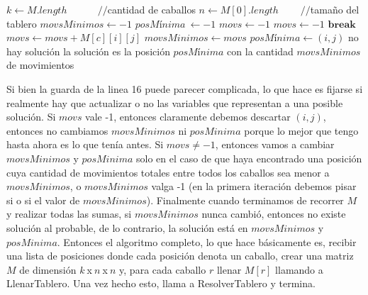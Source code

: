 \documentclass[a4paper]{article}
\begin{document}
\begin{algorithmic}[1]
	\State $k \gets M.length \ \ \ \ \ \ \ \ \ \ \ \ \ \ //$cantidad de caballos
	\State $n \gets M[0].length \ \ \ \ \ \ \ \ \ \ //$tamaño del tablero
	\State $movsMinimos \gets -1$
	\State $posM$í$nima\ \gets -1$
	\newline
			\State $movs \gets -1$
				\State $movs \gets -1$
				\State $\textbf{break}$
			\EndIf
			\State $movs \gets movs + M[c][i][j]$
			\EndFor 
				\State $movsMinimos \gets movs$
				\State $posM$í$nima \gets (i, j)$
			\EndIf
		\EndFor
	\EndFor
	\newline
		\State no hay solución
	\Else
		\State la solución es la posición $posM$í$nima$ con la cantidad $movsMinimos$ de movimientos
	\EndIf
	\newline
\EndProcedure
\end{algorithmic}

\vspace{0.5cm}
\noindent Si bien la guarda de la linea 16 puede parecer complicada, lo que hace es fijarse si realmente hay que actualizar o no las variables que representan a una posible solución. Si $movs$ vale -1, entonces claramente debemos descartar $(i, j)$, entonces no cambiamos $movsMinimos$ ni $posMinima$ porque lo mejor que tengo hasta ahora es lo que tenía antes. Si $movs \neq -1$, entonces vamos a cambiar $movsMinimos$ y $posMinima$ solo en el caso de que haya encontrado una posición cuya cantidad de movimientos totales entre todos los caballos sea menor a $movsMinimos$, o $movsMinimos$ valga -1 (en la primera iteración debemos pisar si o si el valor de $movsMinimos$).
\newline Finalmente cuando terminamos de recorrer $M$ y realizar todas las sumas, si $movsMinimos$ nunca cambió, entonces no existe solución al probable, de lo contrario, la solución está en $movsMinimos$ y $posMinima$.
\newline
\newline Entonces el algoritmo completo, lo que hace básicamente es, recibir una lista de posiciones donde cada posición denota un caballo, crear una matriz $M$ de dimensión $k \ $x$\ n \ $x$ \ n$ y, para cada caballo $r$ llenar $M[r]$ llamando a LlenarTablero. Una vez hecho esto, llama a ResolverTablero y termina.
\end{document}

